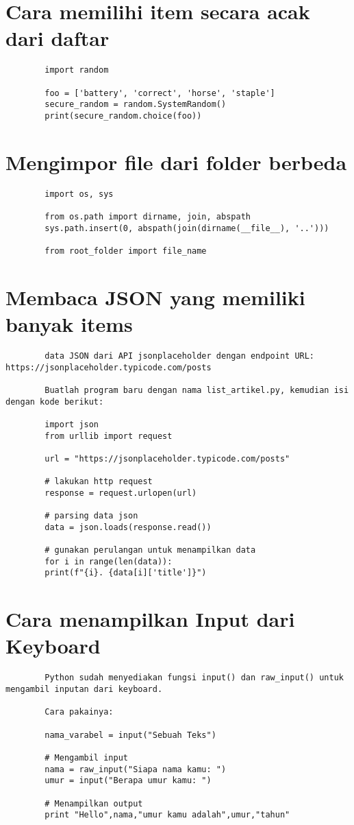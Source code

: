 \documentclass{article}
\begin{document}
	\section{Cara memilihi item secara acak dari daftar}
	\begin{lstlisting}
		import random
		
		foo = ['battery', 'correct', 'horse', 'staple']
		secure_random = random.SystemRandom()
		print(secure_random.choice(foo))
	\end{lstlisting}

	\section{Mengimpor file dari folder berbeda}
	\begin{lstlisting}
		import os, sys
		
		from os.path import dirname, join, abspath
		sys.path.insert(0, abspath(join(dirname(__file__), '..')))
		
		from root_folder import file_name
	\end{lstlisting}

	\section{Membaca JSON yang memiliki banyak items}
	\begin{lstlisting}
		data JSON dari API jsonplaceholder dengan endpoint URL: https://jsonplaceholder.typicode.com/posts
		
		Buatlah program baru dengan nama list_artikel.py, kemudian isi dengan kode berikut:
		
		import json
		from urllib import request
		
		url = "https://jsonplaceholder.typicode.com/posts"
		
		# lakukan http request
		response = request.urlopen(url)
		
		# parsing data json
		data = json.loads(response.read())
		
		# gunakan perulangan untuk menampilkan data
		for i in range(len(data)):
		print(f"{i}. {data[i]['title']}")
	\end{lstlisting}

	\section{Cara menampilkan Input dari Keyboard}
	\begin{lstlisting}
		Python sudah menyediakan fungsi input() dan raw_input() untuk mengambil inputan dari keyboard.
		
		Cara pakainya:
		
		nama_varabel = input("Sebuah Teks")
		
		# Mengambil input
		nama = raw_input("Siapa nama kamu: ")
		umur = input("Berapa umur kamu: ")
		
		# Menampilkan output
		print "Hello",nama,"umur kamu adalah",umur,"tahun"
	\end{lstlisting}
\end{document}
